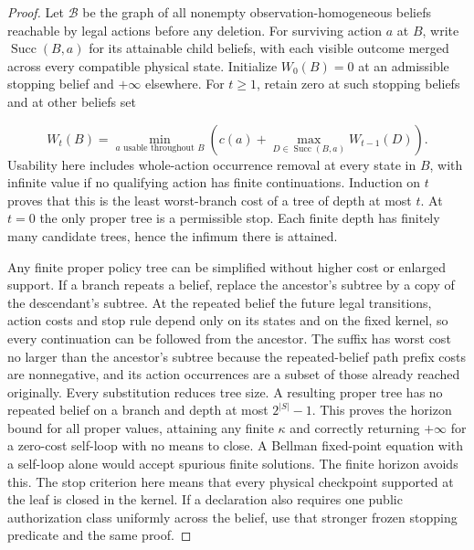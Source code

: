\begin{proof}

Let \(\mathcal B\) be the graph of all nonempty observation-homogeneous beliefs reachable by legal actions before any deletion. For surviving action \(a\) at \(B\), write \(\operatorname{Succ}(B,a)\) for its attainable child beliefs, with each visible outcome merged across every compatible physical state. Initialize \(W_0(B)=0\) at an admissible stopping belief and \(+\infty\) elsewhere. For \(t\ge1\), retain zero at such stopping beliefs and at other beliefs set

\[
W_t(B)=\min_{a\text{ usable throughout }B}\left(c(a)+\max_{D\in\operatorname{Succ}(B,a)}W_{t-1}(D)\right).
\]
Usability here includes whole-action occurrence removal at every state in \(B\), with infinite value if no qualifying action has finite continuations. Induction on \(t\) proves that this is the least worst-branch cost of a tree of depth at most \(t\). At \(t=0\) the only proper tree is a permissible stop. Each finite depth has finitely many candidate trees, hence the infimum there is attained.

Any finite proper policy tree can be simplified without higher cost or enlarged support. If a branch repeats a belief, replace the ancestor's subtree by a copy of the descendant's subtree. At the repeated belief the future legal transitions, action costs and stop rule depend only on its states and on the fixed kernel, so every continuation can be followed from the ancestor. The suffix has worst cost no larger than the ancestor's subtree because the repeated-belief path prefix costs are nonnegative, and its action occurrences are a subset of those already reached originally. Every substitution reduces tree size. A resulting proper tree has no repeated belief on a branch and depth at most \(2^{|S|}-1\). This proves the horizon bound for all proper values, attaining any finite \(\kappa\) and correctly returning \(+\infty\) for a zero-cost self-loop with no means to close. A Bellman fixed-point equation with a self-loop alone would accept spurious finite solutions. The finite horizon avoids this. The stop criterion here means that every physical checkpoint supported at the leaf is closed in the kernel. If a declaration also requires one public authorization class uniformly across the belief, use that stronger frozen stopping predicate and the same proof.


\end{proof}
